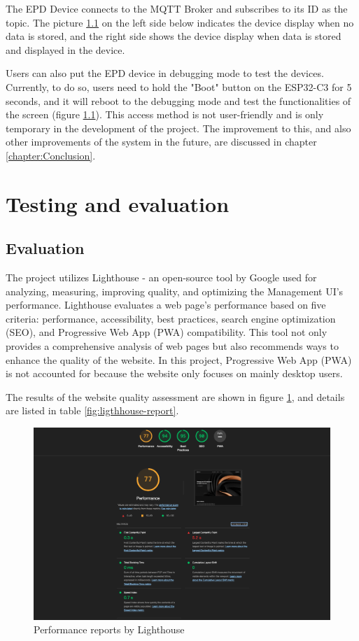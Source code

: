 \documentclass[../Main.tex]{subfiles}
\begin{document}
The \gls{EPD} Device connects to the MQTT Broker and subscribes to its ID as the topic. The picture \ref{} on the left side below indicates the device display when no data is stored, and the right side shows the device display when data is stored and displayed in the device. 

Users can also put the \gls{EPD} device in debugging mode to test the devices. Currently, to do so, users need to hold the "Boot" button on the ESP32-C3 for 5 seconds, and it will reboot to the debugging mode and test the functionalities of the screen (figure \ref{}). This access method is not user-friendly and is only temporary in the development of the project. The improvement to this, and also other improvements of the system in the future, are discussed in chapter \ref{chapter:Conclusion}.

\section{Testing and evaluation}
\subsection{Evaluation}
The project utilizes Lighthouse - an open-source tool by Google used for analyzing, measuring, improving quality, and optimizing the Management UI's performance. Lighthouse evaluates a web page's performance based on five criteria: performance, accessibility, best practices, search engine optimization (SEO), and Progressive Web App (PWA) compatibility. This tool not only provides a comprehensive analysis of web pages but also recommends ways to enhance the quality of the website. In this project, Progressive Web App (PWA) is not accounted for because the website only focuses on mainly desktop users. 

The results of the website quality assessment are shown in figure \ref{fig:ui_light-house}, and details are listed in table \ref{fig:ligthhouse-report}.
\begin{figure}[H]
    \centering
    \includegraphics[width=0.85\linewidth]{doc//imgs/ui_light-house.png}
    \caption{Performance reports by Lighthouse}
    \label{fig:ui_light-house}
\end{figure}
\end{document}
